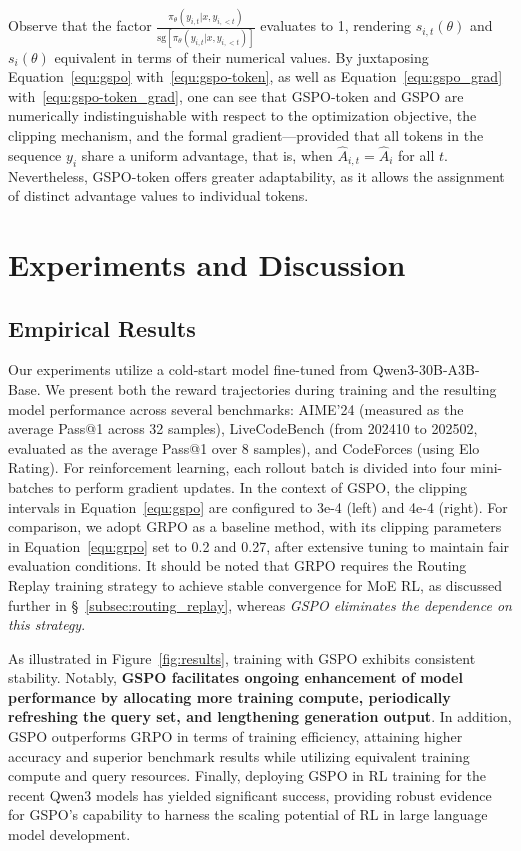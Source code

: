 Observe that the factor $\frac{ \pi_{\theta} (y_{i,t} | x, y_{i,<t}) }{ \mathrm{sg} \left[ \pi_{\theta} (y_{i,t} | x, y_{i,<t}) \right] }$ evaluates to 1, rendering $s_{i,t}(\theta)$ and $s_{i}(\theta)$ equivalent in terms of their numerical values. By juxtaposing Equation~\eqref{equ:gspo} with~\eqref{equ:gspo-token}, as well as Equation~\eqref{equ:gspo_grad} with~\eqref{equ:gspo-token_grad}, one can see that GSPO-token and GSPO are numerically indistinguishable with respect to the optimization objective, the clipping mechanism, and the formal gradient—provided that all tokens in the sequence $y_i$ share a uniform advantage, that is, when $\widehat{A}_{i,t} = \widehat{A}_{i}$ for all $t$. Nevertheless, GSPO-token offers greater adaptability, as it allows the assignment of distinct advantage values to individual tokens.

\section{Experiments and Discussion}

\subsection{Empirical Results}

Our experiments utilize a cold-start model fine-tuned from Qwen3-30B-A3B-Base. We present both the reward trajectories during training and the resulting model performance across several benchmarks: AIME'24 (measured as the average Pass@1 across 32 samples), LiveCodeBench (from 202410 to 202502, evaluated as the average Pass@1 over 8 samples), and CodeForces (using Elo Rating). For reinforcement learning, each rollout batch is divided into four mini-batches to perform gradient updates. In the context of GSPO, the clipping intervals in Equation~\eqref{equ:gspo} are configured to 3e-4 (left) and 4e-4 (right). For comparison, we adopt GRPO as a baseline method, with its clipping parameters in Equation~\eqref{equ:grpo} set to 0.2 and 0.27, after extensive tuning to maintain fair evaluation conditions. It should be noted that GRPO requires the Routing Replay training strategy to achieve stable convergence for MoE RL, as discussed further in \S~\ref{subsec:routing_replay}, whereas \textit{GSPO eliminates the dependence on this strategy}.

As illustrated in Figure~\ref{fig:results}, training with GSPO exhibits consistent stability. Notably, \textbf{GSPO facilitates ongoing enhancement of model performance by allocating more training compute, periodically refreshing the query set, and lengthening generation output}. In addition, GSPO outperforms GRPO in terms of training efficiency, attaining higher accuracy and superior benchmark results while utilizing equivalent training compute and query resources. Finally, deploying GSPO in RL training for the recent Qwen3 models has yielded significant success, providing robust evidence for GSPO’s capability to harness the scaling potential of RL in large language model development.


